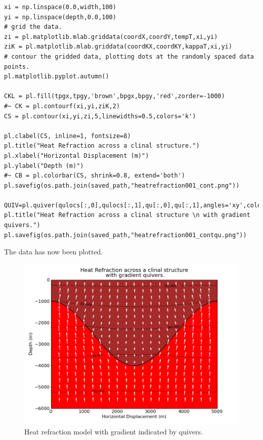 \begin{verbatim}
xi = np.linspace(0.0,width,100)
yi = np.linspace(depth,0.0,100)
# grid the data.
zi = pl.matplotlib.mlab.griddata(coordX,coordY,tempT,xi,yi)
ziK = pl.matplotlib.mlab.griddata(coordKX,coordKY,kappaT,xi,yi)
# contour the gridded data, plotting dots at the randomly spaced data points.
pl.matplotlib.pyplot.autumn()

CKL = pl.fill(tpgx,tpgy,'brown',bpgx,bpgy,'red',zorder=-1000)
#~ CK = pl.contourf(xi,yi,ziK,2)
CS = pl.contour(xi,yi,zi,5,linewidths=0.5,colors='k')

pl.clabel(CS, inline=1, fontsize=8)
pl.title("Heat Refraction across a clinal structure.")
pl.xlabel("Horizontal Displacement (m)")
pl.ylabel("Depth (m)")
#~ CB = pl.colorbar(CS, shrink=0.8, extend='both')
pl.savefig(os.path.join(saved_path,"heatrefraction001_cont.png"))

QUIV=pl.quiver(qulocs[:,0],qulocs[:,1],qu[:,0],qu[:,1],angles='xy',color="white")
pl.title("Heat Refraction across a clinal structure \n with gradient quivers.")
pl.savefig(os.path.join(saved_path,"heatrefraction001_contqu.png"))
\end{verbatim} 
The data has now been plotted.
\begin{figure}[ht]
\centerline{\includegraphics[width=4.in]{figures/heatrefraction001contqu}}
\caption{Heat refraction model with gradient indicated by quivers.}
\label{fig:hr001qumodel}
\end{figure}

\newpage
